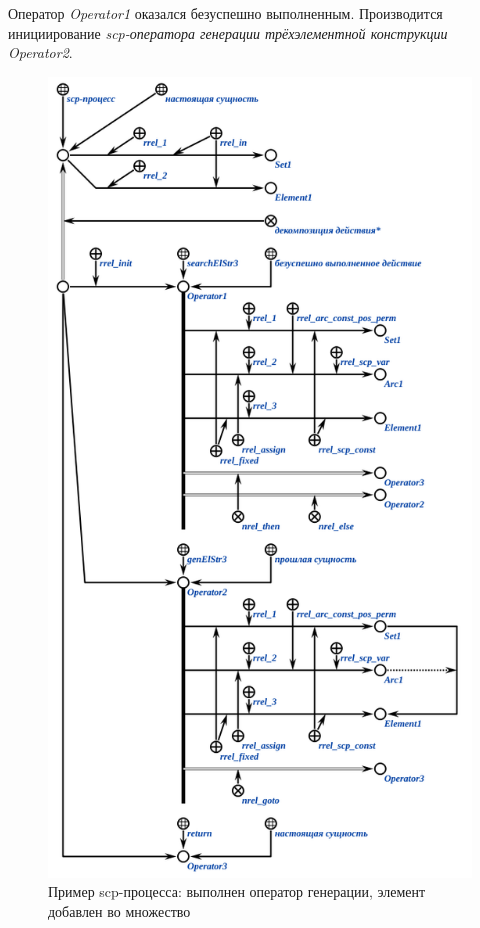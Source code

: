 Оператор \textit{Operator1} оказался безуспешно выполненным. Производится инициирование \textit{\mbox{scp-оператора} генерации трёхэлементной конструкции} ~~~ \textit{Operator2}.

\begin{figure}[H]
	\centering
	\includegraphics[scale=0.8]{images/part3/chapter_situation_management/process_example3.png}
	\caption{Пример scp-процесса: выполнен оператор генерации, элемент добавлен во множество}
	\label{fig:process_example3}
\end{figure}

